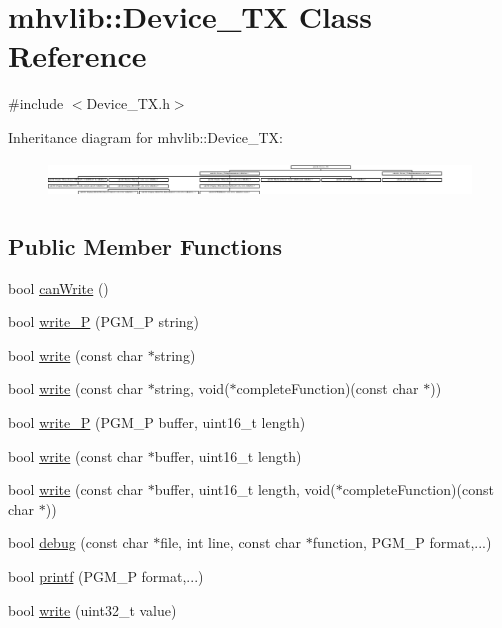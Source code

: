 \hypertarget{classmhvlib_1_1_device___t_x}{\section{mhvlib\-:\-:Device\-\_\-\-T\-X Class Reference}
\label{classmhvlib_1_1_device___t_x}
}


{\ttfamily \#include $<$Device\-\_\-\-T\-X.\-h$>$}

Inheritance diagram for mhvlib\-:\-:Device\-\_\-\-T\-X\-:\begin{figure}[H]
\begin{center}
\leavevmode
\includegraphics[height=0.961538cm]{classmhvlib_1_1_device___t_x}
\end{center}
\end{figure}
\subsection*{Public Member Functions}
\begin{DoxyCompactItemize}
\item 
bool \hyperlink{classmhvlib_1_1_device___t_x_a1895a175aaa3703339dbbcb0ad00f3f8}{can\-Write} ()
\item 
bool \hyperlink{classmhvlib_1_1_device___t_x_ab0cabb0edc2ee5476ca7e6bfe52c1f7a}{write\-\_\-\-P} (P\-G\-M\-\_\-\-P string)
\item 
bool \hyperlink{classmhvlib_1_1_device___t_x_a2ba9a08f3666d119fc896c219e0fc064}{write} (const char $\ast$string)
\item 
bool \hyperlink{classmhvlib_1_1_device___t_x_ae20a1c4cf5aff6f4d365fb41b55066f1}{write} (const char $\ast$string, void($\ast$complete\-Function)(const char $\ast$))
\item 
bool \hyperlink{classmhvlib_1_1_device___t_x_adfaeed7ec7cebaeba69f05e8e504a5c8}{write\-\_\-\-P} (P\-G\-M\-\_\-\-P buffer, uint16\-\_\-t length)
\item 
bool \hyperlink{classmhvlib_1_1_device___t_x_aa2e1c272cab64563aeb194a5cadc90d7}{write} (const char $\ast$buffer, uint16\-\_\-t length)
\item 
bool \hyperlink{classmhvlib_1_1_device___t_x_a9b50ecb010088b7fd7711d2a5294a22a}{write} (const char $\ast$buffer, uint16\-\_\-t length, void($\ast$complete\-Function)(const char $\ast$))
\item 
bool \hyperlink{classmhvlib_1_1_device___t_x_a015ee181dd36a40f3915f3cf752780f3}{debug} (const char $\ast$file, int line, const char $\ast$function, P\-G\-M\-\_\-\-P format,...)
\item 
bool \hyperlink{classmhvlib_1_1_device___t_x_a2a9e4eac95bde0b05013a8ac619ff793}{printf} (P\-G\-M\-\_\-\-P format,...)
\item 
bool \hyperlink{classmhvlib_1_1_device___t_x_ac5bc53bfbb156bb90bcd6fa3d11c8cf5}{write} (uint32\-\_\-t value)
\end{DoxyCompactItemize}
